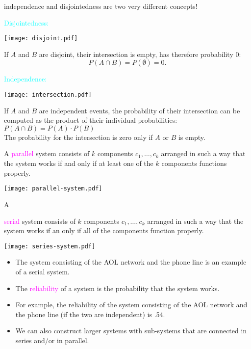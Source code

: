 \documentclass[20pt,landscape]{foils}
\newcommand{\no}{\noindent}
\newcommand{\bul}{\hspace*{.3in}{\textcolor{red}{$\bullet$ \ }}}
\begin{document}
{{{\newpage
\no {\textcolor{magenta}{Warning:}} independence and disjointedness are two very different 
concepts!\\[.1in]
\begin{minipage}[t]{3.5in}
{\textcolor{cyan}{Disjointedness:}}   
    \centerline{\texttt{[image: disjoint.pdf]}}

    If $A$ and $B$ are disjoint, their intersection is empty, has 
    therefore probability 0:
    \[
    P(A \cap B) = P(\emptyset) = 0.
    \]
\end{minipage}
\hfill
\begin{minipage}[t]{3.5in}
{\textcolor{cyan}{Independence: }}
    \centerline{\texttt{[image: intersection.pdf]}}    
    If $A$ and $B$ are independent events, the probability of their 
    intersection can be computed as the product of their individual 
    probabilities: $P(A \cap B) = P(A) \cdot P(B)$\\[.01in]
    The probability for the intersection is zero only if $A$ or $B$ is empty.
\end{minipage}

\foilhead[-.8in]{\textcolor{blue}{On Systems in Series, Systems in Parallel, and Reliability}}
\no \bul A {\textcolor{magenta}{parallel}} system consists of $k$ components $c_{1}, \ldots, c_{k}$ arranged in such a way that the system works if and only if at least one of the $k$ components functions properly.\\[.1in]
\centerline{\texttt{[image: parallel-system.pdf]}}
\no \bul A {\textcolor{magenta}{serial} system consists of $k$ components $c_{1}, \ldots, c_{k}$ arranged in such a way that the system works if an only if all of the components function properly.\\[.1in]
\centerline{\texttt{[image: series-system.pdf]}}
\foilhead[-.8in]{\textcolor{blue}{On Systems and Reliability (continued)}}
\begin{itemize}
\item The system consisting of the AOL network and the phone line is an example of a serial system.
\item The {\textcolor{magenta}{reliability}} of a system is the probability that the system works.
\item For example, the reliability of the system consisting of the AOL network and the phone line (if the two are independent) is .54. 
\item We can also construct larger systems with sub-systems that are connected in series and/or in parallel.
\end{itemize}


}}}}
\end{document}
